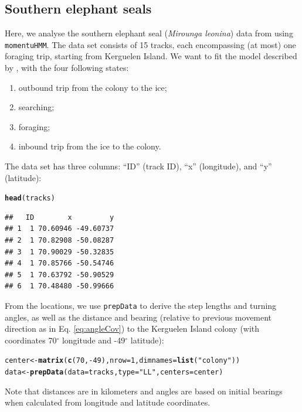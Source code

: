 \documentclass[12pt]{article}\usepackage[]{graphicx}\usepackage[]{color}
\makeatletter
\newcommand{\hlnum}[1]{\textcolor[rgb]{0.686,0.059,0.569}{#1}}%
\newcommand{\hlstr}[1]{\textcolor[rgb]{0.192,0.494,0.8}{#1}}%
\newcommand{\hlopt}[1]{\textcolor[rgb]{0,0,0}{#1}}%
\newcommand{\hlstd}[1]{\textcolor[rgb]{0.345,0.345,0.345}{#1}}%
\newcommand{\hlkwb}[1]{\textcolor[rgb]{0.69,0.353,0.396}{#1}}%
\newcommand{\hlkwc}[1]{\textcolor[rgb]{0.333,0.667,0.333}{#1}}%
\newcommand{\hlkwd}[1]{\textcolor[rgb]{0.737,0.353,0.396}{\textbf{#1}}}%
\newenvironment{kframe}{%
 \def\at@end@of@kframe{}%
 \ifinner\ifhmode%
  \def\at@end@of@kframe{\end{minipage}}%
  \begin{minipage}{\columnwidth}%
 \fi\fi%
 \def\FrameCommand##1{\hskip\@totalleftmargin \hskip-\fboxsep
 \colorbox{shadecolor}{##1}\hskip-\fboxsep
     \hskip-\linewidth \hskip-\@totalleftmargin \hskip\columnwidth}%
 \MakeFramed {\advance\hsize-\width
   \@totalleftmargin\z@ \linewidth\hsize
   \@setminipage}}%
 {\par\unskip\endMakeFramed%
 \at@end@of@kframe}
\newenvironment{knitrout}{}{} %
\newcommand{\stoptocwriting}{%
  \addtocontents{toc}{\protect\setcounter{tocdepth}{-5}}}
\makeatother
\begin{document}
\subsection{Southern elephant seals}
\label{sec:ses}
\stoptocwriting
Here, we analyse the southern elephant seal (\emph{Mirounga leonina}) data from \cite{MichelotEtAl2017} using \verb|momentuHMM|. The data set consists of 15 tracks, each encompassing (at most) one foraging trip, starting from Kerguelen Island. We want to fit the model described by \cite{MichelotEtAl2017}, with the four following states:
\begin{enumerate}
\item outbound trip from the colony to the ice;
\item searching;
\item foraging;
\item inbound trip from the ice to the colony.
\end{enumerate}

The data set has three columns: ``ID'' (track ID), ``x'' (longitude), and ``y'' (latitude):

\begin{knitrout}
\color{fgcolor}\begin{kframe}
\begin{alltt}
\hlkwd{head}\hlstd{(tracks)}
\end{alltt}
\begin{verbatim}
##   ID        x         y
## 1  1 70.60946 -49.60737
## 2  1 70.82908 -50.08287
## 3  1 70.90029 -50.32835
## 4  1 70.85766 -50.54746
## 5  1 70.63792 -50.90529
## 6  1 70.48480 -50.99666
\end{verbatim}
\end{kframe}
\end{knitrout}

From the locations, we use \verb|prepData| to derive the step lengths and turning angles, as well as the distance and bearing (relative to previous movement direction as in Eq. \ref{eq:angleCov}) to the Kerguelen Island colony (with coordinates 70$^{\circ}$ longitude and -49$^{\circ}$ latitude):
\begin{knitrout}
\color{fgcolor}\begin{kframe}
\begin{alltt}
\hlstd{center} \hlkwb{<-} \hlkwd{matrix}\hlstd{(}\hlkwd{c}\hlstd{(}\hlnum{70}\hlstd{,}\hlopt{-}\hlnum{49}\hlstd{),}\hlkwc{nrow}\hlstd{=}\hlnum{1}\hlstd{,}\hlkwc{dimnames}\hlstd{=}\hlkwd{list}\hlstd{(}\hlstr{"colony"}\hlstd{))}
\hlstd{data} \hlkwb{<-} \hlkwd{prepData}\hlstd{(}\hlkwc{data}\hlstd{=tracks,} \hlkwc{type}\hlstd{=}\hlstr{"LL"}\hlstd{,} \hlkwc{centers}\hlstd{=center)}
\end{alltt}
\end{kframe}
\end{knitrout}
Note that distances are in kilometers and angles are based on initial bearings \citep[using geosphere::bearing;][]{Hijmans2016geo} when calculated from longitude and latitude coordinates.  
\end{document}
